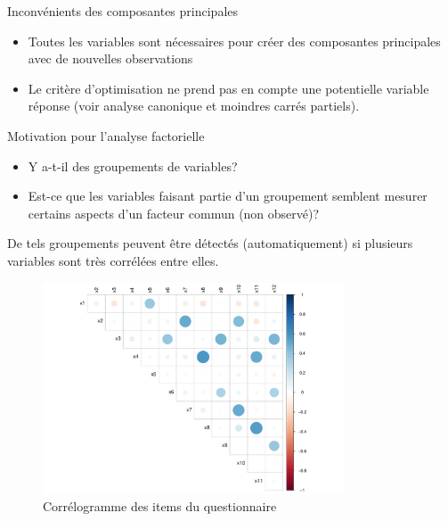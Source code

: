 \documentclass[
  ignorenonframetext,
]{beamer}
\providecommand{\tightlist}{%
  \setlength{\itemsep}{0pt}\setlength{\parskip}{0pt}}\usepackage{longtable,booktabs,array}
\begin{document}
\begin{frame}{Inconvénients des composantes principales}
\protect\hypertarget{inconvuxe9nients-des-composantes-principales}{}
\begin{itemize}
\tightlist
\item
  Toutes les variables sont nécessaires pour créer des composantes
  principales avec de nouvelles observations
\item
  Le critère d'optimisation ne prend pas en compte une potentielle
  variable réponse (voir analyse canonique et moindres carrés partiels).
\end{itemize}
\end{frame}

\begin{frame}{Motivation pour l'analyse factorielle}
\protect\hypertarget{motivation-pour-lanalyse-factorielle}{}
\begin{itemize}
\tightlist
\item
  Y a-t-il des groupements de variables?
\item
  Est-ce que les variables faisant partie d'un groupement semblent
  mesurer certains aspects d'un facteur commun (non observé)?
\end{itemize}

De tels groupements peuvent être détectés (automatiquement) si plusieurs
variables sont très corrélées entre elles.
\end{frame}

\begin{frame}
\begin{figure}

{\centering \includegraphics[width=0.8\textwidth,height=\textheight]{MATH60602-diapos3_files/figure-beamer/fig-correlogram-1.pdf}

}

\caption{\label{fig-correlogram}Corrélogramme des items du
questionnaire}

\end{figure}
\end{frame}
\end{document}
